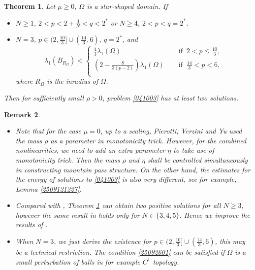 \documentclass[10pt]{article}
\numberwithin{equation}{section}
\newtheorem{theorem}{Theorem}[section]
\newtheorem{remark}[theorem]{Remark}
\numberwithin{equation}{section}
\begin{document}
\begin{theorem}\label{T041805}
Let $\mu\geq 0$,  $\Omega$ is a star-shaped domain. If
\begin{itemize}
\item[\rm (i)] $N\ge 1$, $2<p<2+\frac{4}{N}< q< 2^*$ or $N\geq 4$, $2<p<q=2^*$.
\item[\rm (ii)] $N=3$, $p\in (2, \frac{10}{3}]\cup (\frac{14}{3}, 6)$, $q=2^*$,  and 
\begin{equation}\label{25092601}
\lambda_1(B_{R_{\Omega}})<
\begin{cases}
\frac{4}{3}\lambda_1(\Omega)\quad\; &\mbox{if}\;\; 2<p\le \frac{10}{3},\\
\left(2-\frac{8}{3(p-2)}\right)\lambda_1(\Omega)\quad\; &\mbox{if}\;\;  \frac{14}{3}< p<6,\\
\end{cases}
\end{equation}
where $R_\Omega$ is the inradius of $\Omega$. 
\end{itemize}

Then for  sufficiently small $\rho>0$, problem \eqref{041003} has at least two solutions.
\end{theorem}

\begin{remark}
\begin{itemize}
\item[\rm (i)] Note that for the case $\mu=0$, up to a scaling, Pierotti, Verzini and Yu \cite{Pierotti25}  used the mass $\rho$ as a parameter in monotonicity trick. However, for the combined  nonlinearities, we need to add an extra parameter $\eta$ to take use of  monotonicity trick. Then the mass $\rho$ and $\eta$ shall be controlled simultaneously in constructing mountain pass structure. On the other hand, the estimates for the energy of solutions to \eqref{041003} is also very different, see for example, Lemma \ref{2509121227}. 

\item[\rm (ii)] Compared with \cite{SZarxiv25}, Theorem \ref{T041805} can obtain two positive solutions for all  $N\ge 3$, however the same result in \cite{SZarxiv25} holds  only for $N\in \{3, 4, 5\}$. Hence we improve the results of \cite{SZarxiv25}.


\item[\rm (iii)]  When $N=3$, we just derive the existence for $p\in (2, \frac{10}{3}]\cup (\frac{14}{3}, 6)$, this may be a technical restriction. The condition \eqref{25092601} can be satisfied if $\Omega$ is a small perturbation of balls in for example $C^1$ topology.
\end{itemize}
\end{remark}
\end{document}
